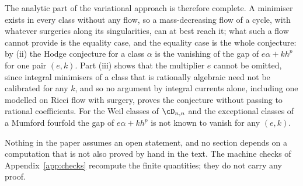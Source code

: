 The analytic part of the variational approach is therefore complete. A minimiser exists in every class without any flow, so a mass-decreasing flow of a cycle, with whatever surgeries along its singularities, can at best reach it; what such a flow cannot provide is the equality case, and the equality case is the whole conjecture: by (ii) the Hodge conjecture for a class $\alpha$ is the vanishing of the gap of $e\alpha+kh^{p}$ for one pair $(e,k)$. Part (iii) shows that the multiplier $e$ cannot be omitted, since integral minimisers of a class that is rationally algebraic need not be calibrated for any $k$, and so no argument by integral currents alone, including one modelled on Ricci flow with surgery, proves the conjecture without passing to rational coefficients. For the Weil classes of $\cD_{n,n}$ and the exceptional classes of a Mumford fourfold the gap of $e\alpha+kh^{p}$ is not known to vanish for any $(e,k)$.

Nothing in the paper assumes an open statement, and no section depends on a computation that is not also proved by hand in the text. The machine checks of Appendix~\ref{app:checks} recompute the finite quantities; they do not carry any proof.
